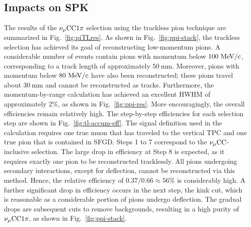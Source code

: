      \subsection{Impacts on SPK}
          The results of the $\nu_{\mu}\textrm{CC}1\pi$ selection using the trackless pion technique are summarized in Fig.~\ref{fig:piTLres}.
          As shown in Fig.~\ref{fig:ppi-stack}, the trackless selection has achieved its goal of reconstructing low-momentum pions.
          A considerable number of events contain pions with momentum below $100~\textrm{MeV}/c$, corresponding to a track length of approximately $50~\textrm{mm}$.
          Moreover, pions with momentum below $80~\textrm{MeV}/c$ have also been reconstructed; these pions travel about $30~\textrm{mm}$ and cannot be reconstructed as tracks.
          Furthermore, the momentum-by-range calculation has achieved an excellent HWHM of approximately $2\%$, as shown in Fig.~\ref{fig:ppi-res}.
          More encouragingly, the overall efficiencies remain relatively high.
          The step-by-step efficiencies for each selection step are shown in Fig.~\ref{fig:tl-accum-eff}.
          The signal definition used in the calculation requires one true muon that has traveled to the vertical TPC and one true pion that is contained in SFGD.
          Steps 1 to 7 correspond to the $\nu_{\mu}\textrm{CC}$-inclusive selection.
          The large drop in efficiency at Step 8 is expected, as it requires exactly one pion to be reconstructed tracklessly.
          All pions undergoing secondary interactions, except for deflection, cannot be reconstructed via this method.
          Hence, the relative efficiency of $0.37/0.66\approx56\%$ is considerably high.
          A further significant drop in efficiency occurs in the next step, the kink cut, which is reasonable as a considerable portion of pions undergo deflection.
          The gradual drops are subsequent cuts to remove backgrounds, resulting in a high purity of $\nu_{\mu}\textrm{CC}1\pi$, as shown in Fig.~\ref{fig:ppi-stack}.

